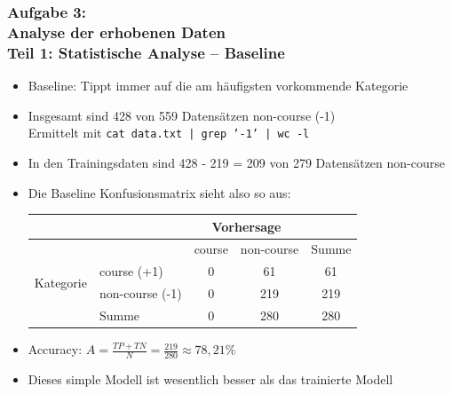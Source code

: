 \documentclass[accentcolor=tud7b,noresetcounter]{tudbeamer}
\begin{document}
	\begin{frame}
		\frametitle{Aufgabe 3:\\ Analyse der erhobenen Daten\\ Teil 1: Statistische Analyse -- Baseline}
		\begin{itemize}
			\item Baseline: Tippt immer auf die am häufigsten vorkommende Kategorie
			\item Insgesamt sind 428 von 559 Datensätzen non-course (-1) \\
			      Ermittelt mit \texttt{cat data.txt | grep '-1' | wc -l}
			\item In den Trainingsdaten sind 428 - 219 = 209 von 279 Datensätzen non-course
			\item Die Baseline Konfusionsmatrix sieht also so aus: \\
			\begin{tabular}{|l|l|c|c||c|}
		\hline
			& & \multicolumn{2}{c|}{Vorhersage} & \\
			\hline
			& & course & non-course & Summe \\
			\hline
		\multirow{2}{*}{Kategorie} & course (+1) & 0 & 61 & 61 \\
		\cline{2-5}
		& non-course (-1) & 0  & 219 & 219\\
		\hline
		& Summe & 0 & 280 & 280 \\
		\hline
		\end{tabular}
			\item Accuracy: $A = \frac{TP + TN}{N} = \frac{219}{280} \approx 78,21\%$
			\item Dieses simple Modell ist wesentlich besser als das trainierte Modell
		\end{itemize}
	\end{frame}
	
\end{document}

